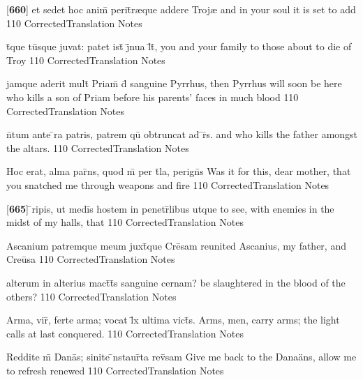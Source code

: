 \latline
  {[\textbf{660}] et sedet hoc anim\={} perit\={}r{\ae}que addere Troj{\ae}}
  { and in your soul it is set to add }
  {110}
  { CorrectedTranslation }
  { Notes }


\latline
  {t\={}que tu\={}sque juvat: patet ist\={\macron {\i}} j\={}nua l\={}t\={},}
  { you and your family to those about to die of Troy }
  {110}
  { CorrectedTranslation }
  { Notes }


\latline
  {jamque aderit mult\={} Priam\={\macron {\i}} d\={} sanguine Pyrrhus,}
  { then  Pyrrhus will soon be here who kills a son of Priam before his parents' faces in much blood }
  {110}
  { CorrectedTranslation }
  { Notes }


\latline
  {n\={}tum ante \={}ra patris, patrem qu\={\macron {\i}} obtruncat ad \={}r\={}s.}
  { and who kills the father amongst the altars. }
  {110}
  { CorrectedTranslation }
  { Notes }


\latline
  {Hoc erat, alma par\={}ns, quod m\={} per t\={}la, perign\={\macron {\i}}s}
  { Was it for this, dear mother, that you snatched me through weapons and fire }
  {110}
  { CorrectedTranslation }
  { Notes }


\latline
  {[\textbf{665}] \={}ripis, ut medi\={\macron {\i}}s hostem in penetr\={}libus utque}
  { to see, with enemies in the midst of my halls, that }
  {110}
  { CorrectedTranslation }
  { Notes }


\latline
  {Ascanium patremque meum juxt\={}que Cre\={}sam}
  { reunited Ascanius, my father, and Cre\={u}sa }
  {110}
  { CorrectedTranslation }
  { Notes }


\latline
  {alterum in alterius mact\={}t\={}s sanguine cernam?}
  { be slaughtered in the blood of the others? }
  {110}
  { CorrectedTranslation }
  { Notes }


\latline
  {Arma, vir\={\macron {\i}}, ferte arma; vocat l\={}x ultima vict\={}s.}
  { Arms, men, carry arms; the light calls at last conquered. }
  {110}
  { CorrectedTranslation }
  { Notes }


\latline
  {Reddite m\={} Dana\={\macron {\i}}s; sinite \={\macron {\i}}nstaur\={}ta rev\={\macron {\i}}sam}
  { Give me back to the Dana\"ans, allow me to refresh renewed }
  {110}
  { CorrectedTranslation }
  { Notes }


